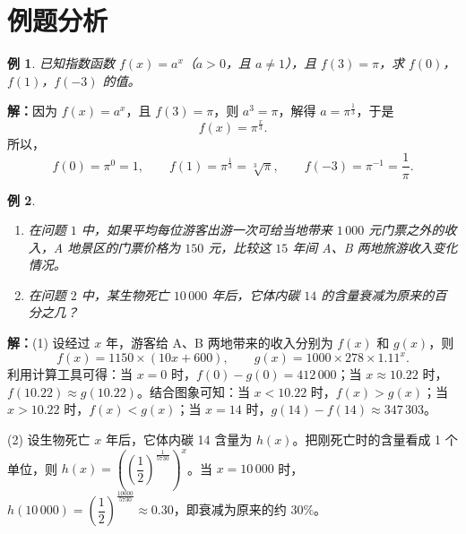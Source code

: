 \documentclass[aspectratio=169,11pt,t,fleqn]{ctexbeamer}
\newtheorem{instance}{例}%
\begin{document}
\section{例题分析}
\begin{frame}{}
  \begin{instance}
  	已知指数函数 $f(x)=a^x$（$a>0$，且 $a\neq 1$），且 $f(3)=\pi$，求 $f(0)$，$f(1)$，$f(-3)$ 的值。
  \end{instance}

  \vspace{0.5em}
\pause
  \vspace{0.5em}
  \textbf{解：}因为 $f(x)=a^x$，且 $f(3)=\pi$，则 $a^3=\pi$，解得 $a=\pi^{\frac13}$，于是
  \[
    f(x)=\pi^{\frac{x}{3}}.
  \]
  所以，
  \[
    f(0)=\pi^0=1,\qquad
    f(1)=\pi^{\frac13}=\sqrt[3]{\pi},\qquad
    f(-3)=\pi^{-1}=\frac1\pi.
  \]
\end{frame}

\begin{frame}{}\vspace{-1em}
\begin{instance}
  \begin{enumerate}[(\arabic*)]
    \item 在问题 $1$ 中，如果平均每位游客出游一次可给当地带来 $1\,000$ 元门票之外的收入，A 地景区的门票价格为 $150$ 元，比较这 $15$ 年间 A、B 两地旅游收入变化情况。
    \item 在问题 $2$ 中，某生物死亡 $10\,000$ 年后，它体内碳 $14$ 的含量衰减为原来的百分之几？
  \end{enumerate}
\end{instance}
  \vspace{0.4em}\pause
  \textbf{解：}(1) 设经过 $x$ 年，游客给 A、B 两地带来的收入分别为 $f(x)$ 和 $g(x)$，则
  \[
    f(x)=1150\times(10x+600),\qquad
    g(x)=1000\times278\times1.11^x.
  \]
  利用计算工具可得：当 $x=0$ 时，$f(0)-g(0)=412\,000$；当 $x\approx10.22$ 时，$f(10.22)\approx g(10.22)$。结合图象可知：当 $x<10.22$ 时，$f(x)>g(x)$；当 $x>10.22$ 时，$f(x)<g(x)$；当 $x=14$ 时，$g(14)-f(14)\approx347\,303$。

  \vspace{0.4em}
  (2) 设生物死亡 $x$ 年后，它体内碳 14 含量为 $h(x)$。把刚死亡时的含量看成 1 个单位，则
  $h(x)=\left(\left(\dfrac12\right)^{\frac1{5730}}\right)^x$。当 $x=10\,000$ 时，
  $h(10\,000)=\left(\dfrac12\right)^{\frac{10000}{5730}}\approx0.30$，即衰减为原来的约 $30\%$。
\end{frame}
\end{document}

